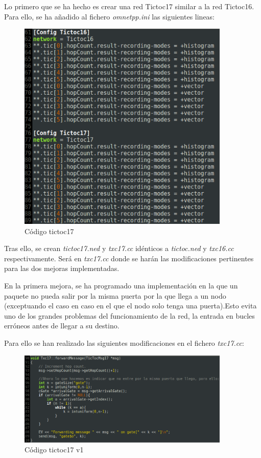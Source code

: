 \documentclass{article}
\begin{document}
		
		Lo primero que se ha hecho es crear una red Tictoc17 similar a la red Tictoc16. Para ello, se ha añadido al fichero \textit{omnetpp.ini} las siguientes lineas:\\
		
		\begin{figure}[htbp]
		\centering
		\includegraphics[width=0.9\textwidth]{figura1.png}
		\caption{Código tictoc17}
		\end {figure}
			
	
		Tras ello, se crean \textit{tictoc17.ned} y \textit{txc17.cc} idénticos a \textit{tictoc.ned} y \textit{txc16.cc} respectivamente. Será en \textit{txc17.cc} donde se harán las modificaciones pertinentes para las dos mejoras implementadas.
		
		En la primera mejora, se ha programado una implementación en la que un paquete no pueda salir por la misma puerta por la que llega a un nodo (exceptuando el caso en caso en el que el nodo solo tenga una puerta).Esto evita uno de los grandes problemas del funcionamiento de la red, la entrada en bucles erróneos antes de llegar a su destino.
		
		Para ello se han realizado las siguientes modificaciones en el fichero \textit{txc17.cc}:
		
		\newpage
		
		\begin{figure}[htbp]
		\centering
		\includegraphics[width=0.9\textwidth]{figura2.png}
		\caption{Código tictoc17 v1}
		\end {figure}
			
\end{document}
